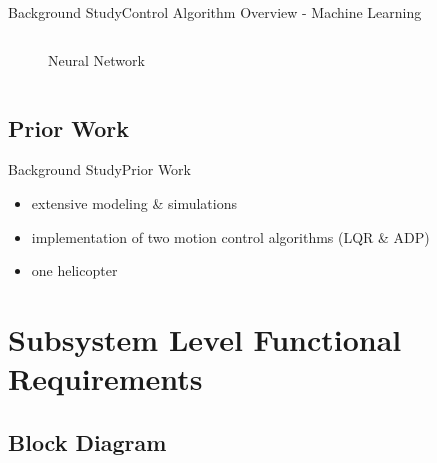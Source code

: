 \documentclass{beamer}
\begin{document}
\begin{frame}{Background Study}{Control Algorithm Overview - Machine Learning}
\begin{columns}
\begin{figure}
      \caption{Neural Network}
      \label{fig:ADP_Neural_Network2}
    \end{figure}    
    \end{columns}
\end{frame}

\subsection{Prior Work}

\begin{frame}{Background Study}{Prior Work}
  \begin{itemize}
      \item extensive modeling \& simulations
      \item implementation of two motion control algorithms (LQR \& ADP)
      \item one helicopter
  \end{itemize}
\end{frame}



  


\section{Subsystem Level Functional Requirements}



\subsection{Block Diagram}
\end{document}

